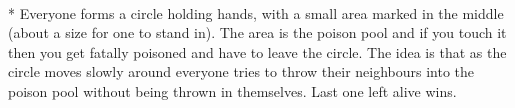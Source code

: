\begin{minipage}{\textwidth}
\\*
Everyone forms a circle holding hands, with a small area marked in the middle (about a size for one to stand in). The area is the poison pool and if you touch it then you get fatally poisoned and have to leave the circle. The idea is that as the circle moves slowly around everyone tries to throw their neighbours into the poison pool without being thrown in themselves. Last one left alive wins.
\end{minipage}    \vfill
